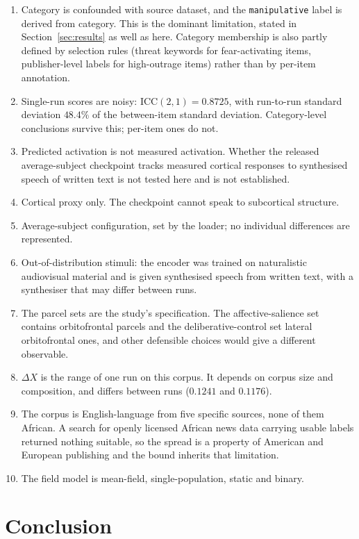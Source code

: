 \documentclass[preprint,12pt]{elsarticle}
\begin{document}
\begin{enumerate}
\item Category is confounded with source dataset, and the \texttt{manipulative} label is
derived from category. This is the dominant limitation, stated in Section~\ref{sec:results}
as well as here. Category membership is also partly defined by selection rules (threat
keywords for fear-activating items, publisher-level labels for high-outrage items) rather
than by per-item annotation.
\item Single-run scores are noisy: $\mathrm{ICC}(2,1) = 0.8725$, with run-to-run standard
deviation $48.4\%$ of the between-item standard deviation. Category-level conclusions survive
this; per-item ones do not.
\item Predicted activation is not measured activation. Whether the released average-subject
checkpoint tracks measured cortical responses to synthesised speech of written text is not
tested here and is not established.
\item Cortical proxy only. The checkpoint cannot speak to subcortical structure.
\item Average-subject configuration, set by the loader; no individual differences are
represented.
\item Out-of-distribution stimuli: the encoder was trained on naturalistic audiovisual
material and is given synthesised speech from written text, with a synthesiser that may differ
between runs.
\item The parcel sets are the study's specification. The affective-salience set contains
orbitofrontal parcels and the deliberative-control set lateral orbitofrontal ones, and other
defensible choices would give a different observable.
\item $\Delta X$ is the range of one run on this corpus. It depends on corpus size and
composition, and differs between runs ($0.1241$ and $0.1176$).
\item The corpus is English-language from five specific sources, none of them African. A
search for openly licensed African news data carrying usable labels returned nothing
suitable, so the spread is a property of American and European publishing and the bound
inherits that limitation.
\item The field model is mean-field, single-population, static and binary.
\end{enumerate}

\section{Conclusion}
\label{sec:conclusion}
\end{document}
